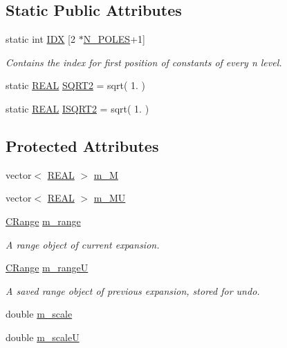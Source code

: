\subsection*{Static Public Attributes}
\begin{DoxyCompactItemize}
\item 
static int \hyperlink{classCExpan_a0e7564a3c13370795a342ce9d4b263a7}{I\-D\-X} \mbox{[}2 $\ast$\hyperlink{expansion_8h_ac23f9c13c5d07d9ce386f7a830c35e5a}{N\-\_\-\-P\-O\-L\-E\-S}+1\mbox{]}
\begin{DoxyCompactList}\small\item\em Contains the index for first position of constants of every n level. \end{DoxyCompactList}\item 
static \hyperlink{util_8h_a5821460e95a0800cf9f24c38915cbbde}{R\-E\-A\-L} \hyperlink{classCExpan_aa5282327718d2c6dbff1ef2fbc0fe4dd}{S\-Q\-R\-T2} = sqrt( 1. )
\item 
static \hyperlink{util_8h_a5821460e95a0800cf9f24c38915cbbde}{R\-E\-A\-L} \hyperlink{classCExpan_a4b0d1b36d98257b16600f1ffc6d20ba3}{I\-S\-Q\-R\-T2} = sqrt( 1. )
\end{DoxyCompactItemize}
\subsection*{Protected Attributes}
\begin{DoxyCompactItemize}
\item 
vector$<$ \hyperlink{util_8h_a5821460e95a0800cf9f24c38915cbbde}{R\-E\-A\-L} $>$ \hyperlink{classCExpan_a6016c7f7b961e2f69c6d7ca9daedbbf5}{m\-\_\-\-M}
\item 
vector$<$ \hyperlink{util_8h_a5821460e95a0800cf9f24c38915cbbde}{R\-E\-A\-L} $>$ \hyperlink{classCExpan_a151aff07c3667229bfa6d9d3e6e87dfc}{m\-\_\-\-M\-U}
\item 
\hyperlink{classCRange}{C\-Range} \hyperlink{classCExpan_adca887f9cd66e5e5c800a41c3e406559}{m\-\_\-range}
\begin{DoxyCompactList}\small\item\em A range object of current expansion. \end{DoxyCompactList}\item 
\hyperlink{classCRange}{C\-Range} \hyperlink{classCExpan_ae9c36d68e7ef5bdf74ad220141367792}{m\-\_\-range\-U}
\begin{DoxyCompactList}\small\item\em A saved range object of previous expansion, stored for undo. \end{DoxyCompactList}\item 
double \hyperlink{classCExpan_a4dba59941eefe0f6d70fb89f1e610d77}{m\-\_\-scale}
\item 
double \hyperlink{classCExpan_a16aade514bb13da387040369e7137aeb}{m\-\_\-scale\-U}
\end{DoxyCompactItemize}

